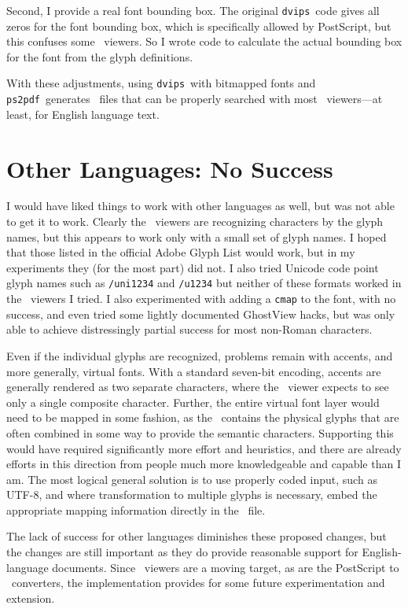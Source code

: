 \documentclass{ltugboat}
\def\PDF{\acro{PDF}}
\def\dvips{\texttt{dvips}}
\def\ps2pdf{\texttt{ps2pdf}}
\begin{document}
Second, I provide a real font bounding
box.  The original \dvips\ code gives all zeros for the font
bounding box, which is specifically allowed by PostScript,
but this confuses some \PDF\ viewers.  So I wrote code to
calculate the actual bounding box for the font from the
glyph definitions.

With these adjustments, using \dvips\ with bitmapped fonts
and \ps2pdf\ generates \PDF\ files that can be properly
searched with most \PDF\ viewers---at least, for English
language text.

\section{Other Languages: No Success}

I would have liked things to work with other languages as
well, but was not able to get it to work.  Clearly the
\PDF\ viewers are recognizing characters by the glyph
names, but this appears to work only with a small set of
glyph names.  I hoped that those listed in the official
Adobe Glyph List \cite{AGL} would work, but in my experiments they
(for the most part) did not.  I also tried Unicode code
point glyph names such as \texttt{/uni1234} and \texttt{/u1234}
but neither of these formats worked in the \PDF\ viewers
I tried.  I also experimented with adding a \texttt{cmap}
to the font, with no success, and even tried some lightly
documented GhostView hacks, but was only able to achieve
distressingly partial success for most non-Roman characters.

Even if the individual glyphs are recognized, problems remain
with accents, and more generally, virtual fonts.
With a standard seven-bit encoding, accents are generally
rendered as two separate characters, where the \PDF\ viewer
expects to see only a single composite character.  Further,
the entire virtual font layer would need to be mapped in
some fashion, as the \PDF\ contains the physical glyphs
that are often combined in some way to provide the semantic
characters.  Supporting this would have required significantly
more effort and heuristics, and there are already efforts in
this direction from people much more knowledgeable and capable
than I am.  The most logical general solution is to use properly
coded input, such as UTF-8, and where transformation to multiple
glyphs is necessary, embed the appropriate mapping information
directly in the \PDF\ file.

The lack of success for other languages diminishes these
proposed changes, but the changes are still important as they
do provide reasonable support for English-language documents.
Since \PDF\ viewers are a moving target, as are the PostScript
to \PDF\ converters, the implementation provides for some future
experimentation and extension.
\end{document}
